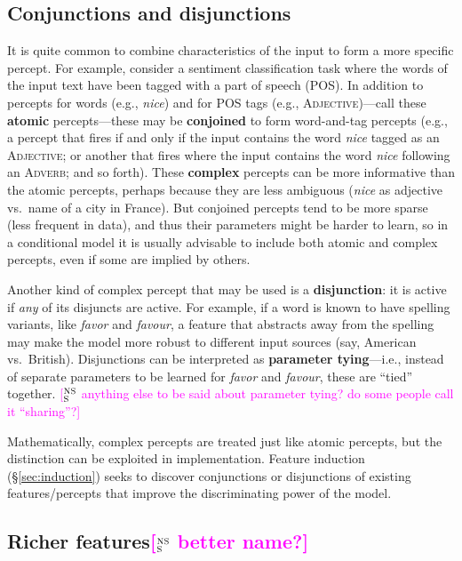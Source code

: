 \documentclass[11pt,letterpaper]{article}
\newcommand{\ensuretext}[1]{#1}
\newcommand{\nssmarker}{\ensuretext{\textcolor{magenta}{\ensuremath{^{\textsc{NS}}_{\textsc{S}}}}}}
\newcommand{\arkcomment}[3]{\ensuretext{\textcolor{#3}{[#1 #2]}}}
\newcommand{\nss}[1]{\arkcomment{\nssmarker}{#1}{magenta}}
\newcommand{\Sref}[1]{\S\ref{#1}}
\begin{document}
\subsection{Conjunctions and disjunctions}\label{sec:complex}

It is quite common to combine characteristics of the input to form a more specific percept.
For example, consider a sentiment classification task where the words of the input text have been 
tagged with a part of speech (POS). In addition to percepts for words (e.g., \textit{nice}) 
and for POS tags (e.g., \textsc{Adjective})---call these \textbf{atomic} percepts---these may be 
\textbf{conjoined} to form word-and-tag percepts (e.g., a percept that fires if and only if the input contains 
the word \textit{nice} tagged as an \textsc{Adjective}; or another that fires where the input contains 
the word \textit{nice} following an \textsc{Adverb}; and so forth).
These \textbf{complex} percepts can be more informative than the atomic percepts, 
perhaps because they are less ambiguous (\textit{nice} as adjective vs.~name of a city in France).
But conjoined percepts tend to be more sparse (less frequent in data), and thus their parameters might be harder to learn, 
so in a conditional model it is usually advisable to include both atomic and complex percepts, 
even if some are implied by others.

Another kind of complex percept that may be used is a \textbf{disjunction}: it is active if 
{\em any} of its disjuncts are active. For example, if a word is known to have spelling variants, 
like \textit{favor} and \textit{favour}, a feature that abstracts away from the spelling 
may make the model more robust to different input sources (say, American vs.~British).
Disjunctions can be interpreted as \textbf{parameter tying}---i.e., instead of separate parameters 
to be learned for \textit{favor} and \textit{favour}, these are ``tied'' together.
\nss{anything else to be said about parameter tying? do some people call it ``sharing''?}

Mathematically, complex percepts are treated just like atomic percepts, 
but the distinction can be exploited in implementation.
Feature induction (\Sref{sec:induction}) seeks to discover conjunctions or disjunctions of 
existing features/percepts that improve the discriminating power of the model.


\subsection{Richer features\nss{better name?}}\label{sec:richer}
\end{document}
